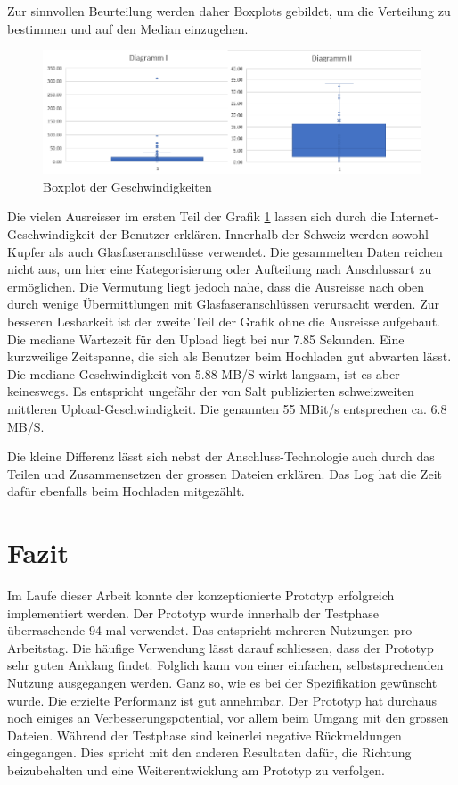 Zur sinnvollen Beurteilung werden daher Boxplots gebildet, um die Verteilung zu bestimmen und auf den Median einzugehen.
\begin{figure}[!h]
    \centering
    \includegraphics[width=1\linewidth]{content/images/diagramme.png}
    \caption{Boxplot der Geschwindigkeiten}
    \label{fig:diagramme}
\end{figure} 

Die vielen Ausreisser im ersten Teil der Grafik \ref{fig:diagramme} lassen sich durch die Internet-Geschwindigkeit der Benutzer erklären.
Innerhalb der Schweiz werden sowohl Kupfer als auch Glasfaseranschlüsse verwendet.
Die gesammelten Daten reichen nicht aus, um hier eine Kategorisierung oder Aufteilung nach Anschlussart zu ermöglichen.
Die Vermutung liegt jedoch nahe, dass die Ausreisse nach oben durch wenige Übermittlungen mit Glasfaseranschlüssen verursacht werden.
Zur besseren Lesbarkeit ist der zweite Teil der Grafik ohne die Ausreisse aufgebaut. 
Die mediane Wartezeit für den Upload liegt bei nur 7.85 Sekunden. Eine kurzweilige Zeitspanne, die sich als Benutzer beim Hochladen gut abwarten lässt.
Die mediane Geschwindigkeit von 5.88 MB/S wirkt langsam, ist es aber keineswegs. 
Es entspricht ungefähr der von Salt \cite{Salt} publizierten schweizweiten mittleren Upload-Geschwindigkeit. Die genannten 55 MBit/s entsprechen ca. 6.8 MB/S.

Die kleine Differenz lässt sich nebst der Anschluss-Technologie auch durch das Teilen und Zusammensetzen der grossen Dateien erklären.
Das Log hat die Zeit dafür ebenfalls beim Hochladen mitgezählt. 


\section{Fazit}
Im Laufe dieser Arbeit konnte der konzeptionierte Prototyp erfolgreich implementiert werden.
Der Prototyp wurde innerhalb der Testphase überraschende 94 mal verwendet. Das entspricht mehreren Nutzungen pro Arbeitstag.
Die häufige Verwendung lässt darauf schliessen, dass der Prototyp sehr guten Anklang findet.
Folglich kann von einer einfachen, selbstsprechenden Nutzung ausgegangen werden. 
Ganz so, wie es bei der Spezifikation gewünscht wurde. Die erzielte Performanz ist gut annehmbar. 
Der Prototyp hat durchaus noch einiges an Verbesserungspotential, vor allem beim Umgang mit den grossen Dateien.
Während der Testphase sind keinerlei negative Rückmeldungen eingegangen. 
Dies spricht mit den anderen Resultaten dafür, die Richtung beizubehalten und eine Weiterentwicklung am Prototyp zu verfolgen.